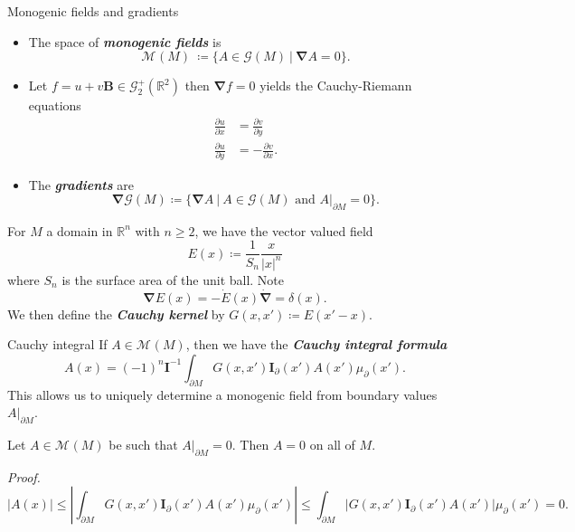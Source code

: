 \documentclass[aspectratio=169,handout]{beamer}
\newcommand\boldgreen[1]{\textcolor{lighter_csu_green}{\emph{\textbf{#1}}}}
\newcommand{\R}{\mathbb{R}}
\newcommand{\grad}{\boldsymbol{\nabla}}
\newcommand{\G}{\mathcal{G}}
\newcommand{\blade}[1]{\boldsymbol{#1}}
\newcommand{\boundary}{{\partial M}}
\newcommand{\pseudoscalar}{\blade{I}}
\newcommand{\monogenicfields}[1]{\mathcal{M}^{#1}(M)}
\begin{document}
\begin{frame}{Monogenic fields and gradients}
\vfill
\begin{itemize}
\item The space of \boldgreen{monogenic fields} is
\[
\monogenicfields{} ~\coloneqq \{ A \in \G(M) ~\vert~ \grad A = 0 \}.
\]

\item Let $f=u+v\blade{B} \in \G_2^+(\R^2)$ then $\grad f = 0$ yields the Cauchy-Riemann equations
\begin{align*}
    \frac{\partial u}{\partial x} &= \frac{\partial v}{\partial y}\\
    \frac{\partial u}{\partial y} &= -\frac{\partial v}{\partial x}.
\end{align*}

\item The \boldgreen{gradients} are 
\[
\grad \G(M) \coloneqq \{\grad A ~\vert~ A \in \G(M) \textrm{~and~} A\vert_\boundary = 0 \}.
\]
\end{itemize}
\vfill
\end{frame}

\begin{frame}{}
\vfill
For $M$ a domain in $\R^n$ with $n\geq 2$, we have the vector valued field
\[
E(x) \coloneqq \frac{1}{S_n} \frac{x}{|x|^n}
\]
where $S_n$ is the surface area of the unit ball. Note
\[
\grad E(x) = -\dot{E}(x)\dot{\grad} = \delta(x).
\]
We then define the \boldgreen{Cauchy kernel} by $G(x,x')\coloneqq E(x'-x)$.
\vfill
\end{frame}

\begin{frame}{Cauchy integral}
\vfill
If $A\in \monogenicfields{}$, then we have the \boldgreen{Cauchy integral formula}
\[
A(x) = (-1)^n \pseudoscalar^{-1} \int_\boundary G(x,x') \pseudoscalar_\partial(x') A(x') \mu_\partial(x').
\]
This allows us to uniquely determine a monogenic field from boundary values $A\vert_\boundary$.
\vfill
\end{frame}

\begin{frame}{}
\vfill
\begin{lemma}
Let $A\in \monogenicfields{}$ be such that $A\vert_\boundary = 0$. Then $A=0$ on all of $M$.
\end{lemma}
\emph{Proof.}
\[
|A(x)| \leq \left| \int_{\boundary} G(x,x') \pseudoscalar_{\partial}(x') A(x') \mu_\partial(x') \right| \leq  \int_{\boundary}\left| G(x,x') \pseudoscalar_{\partial}(x') A(x') \right| \mu_\partial(x') =0.
\]
\vfill
\end{frame}
\end{document}
